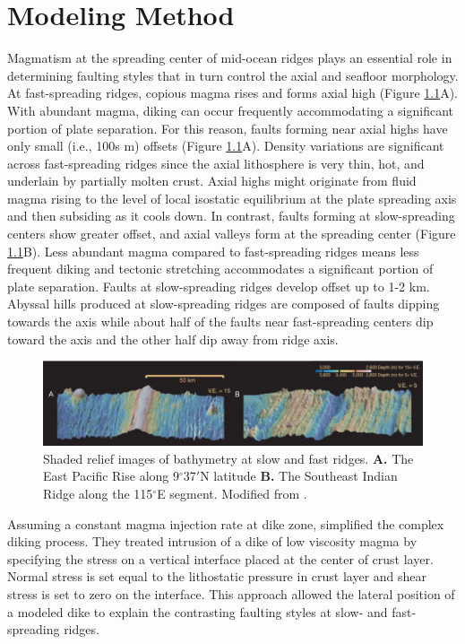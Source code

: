 \documentclass[letterpaper,12pt,notitle]{memphisthesis}                     %
\begin{document}
\chapter{Modeling Method}

Magmatism at the spreading center of mid-ocean ridges plays an essential role in determining faulting styles that in turn control the axial and seafloor morphology. At fast-spreading ridges, copious magma rises and forms axial high (Figure \ref{fig:ridgebathymetry}A). With abundant magma, diking can occur frequently accommodating a significant portion of plate separation. For this reason, faults forming near axial highs have only small (i.e., 100s m) offsets (Figure \ref{fig:ridgebathymetry}A). Density variations are significant across fast-spreading ridges since the axial lithosphere is very thin, hot, and underlain by partially molten crust. Axial highs might originate from fluid magma rising to the level of local isostatic equilibrium at the plate spreading axis and then subsiding as it cools down. In contrast, faults forming at slow-spreading centers show greater offset, and axial valleys form at the spreading center (Figure \ref{fig:ridgebathymetry}B). Less abundant magma compared to fast-spreading ridges means less frequent diking and tectonic stretching accommodates a significant portion of plate separation. Faults at slow-spreading ridges develop offset up to 1-2 km. Abyssal hills produced at slow-spreading ridges are composed of faults dipping towards the axis while about half of the faults near fast-spreading centers dip toward the axis and the other half dip away from ridge axis.

\begin{figure}[!htb]
	\centering
	\includegraphics[width=0.99\linewidth]{./figs/bathy_buck.png}
	\caption{Shaded relief images of bathymetry at slow and fast ridges. \textbf{A.} The East Pacific Rise along 9$^\circ$37$'$N latitude \textbf{B.} The Southeast Indian Ridge along the 115$^\circ$E segment. Modified from \citet{Buck2005}.}
	\label{fig:ridgebathymetry}
\end{figure}

Assuming a constant magma injection rate at dike zone, \citet{Buck1998} simplified the complex diking process. They treated intrusion of a dike of low viscosity magma by specifying the stress on a vertical interface placed at the center of crust layer. Normal stress is set equal to the lithostatic pressure in crust layer and shear stress is set to zero on the interface.
This approach allowed the lateral position of a modeled dike to explain the contrasting faulting styles at slow- and fast-spreading ridges.
\end{document}
